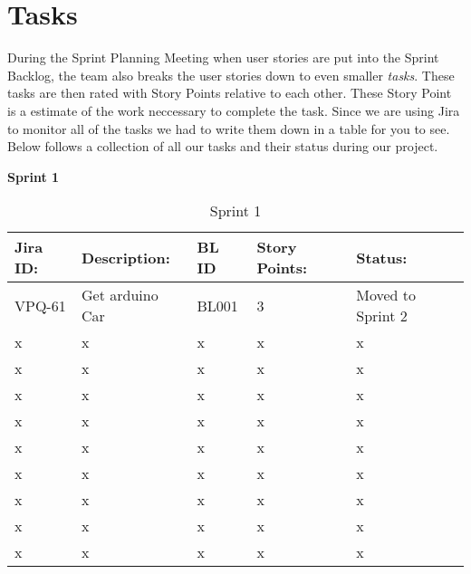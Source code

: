 \section{Tasks}
During the Sprint Planning Meeting when user stories are put into the Sprint Backlog, the team also breaks the user stories down to even smaller \textit{tasks}. These tasks are then rated with Story Points relative to each other. These Story Point is a estimate of the work neccessary to complete the task. Since we are using Jira to monitor all of the tasks we had to write them down in a table for you to see. Below follows a collection of all our tasks and their status during our project.


\centering\LARGE\textbf{Sprint 1}
\begin{table}[ht]
\begin{tabularx}{\linewidth}{|m{1.85cm} m{5.5cm} m{1.2cm} m{1.5cm} m{4.3cm}|}
\hline
    \rowcolor{cadetgrey} 
     \textbf{Jira ID:} & \textbf{Description:} & \textbf{BL ID} & \textbf{Story Points:} & \textbf{Status: } \\ \hline
      VPQ-61 & Get arduino Car & BL001 & 3\centering & Moved to Sprint 2  \\ 
     \rowcolor{gainsboro} x & x & x & x\centering & x  \\
      x & x & x & x\centering & x  \\
      \rowcolor{gainsboro}x & x & x & x\centering & x  \\
      x & x & x & x\centering & x  \\
     \rowcolor{gainsboro} x & x & x & x\centering & x  \\
      x & x & x & x\centering & x  \\
     \rowcolor{gainsboro} x & x & x & x\centering & x  \\    
      x & x & x & x\centering & x  \\
    \rowcolor{gainsboro}  x & x & x & x\centering & x  \\
\hline    
\end{tabularx}
\caption{Sprint 1}
\end{table}


